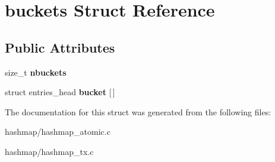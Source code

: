 \hypertarget{structbuckets}{}\section{buckets Struct Reference}
\label{structbuckets}
\subsection*{Public Attributes}
\begin{DoxyCompactItemize}
\item 
\mbox{\label{structbuckets_ab4b1efc42ff06fef401feb5297469441}} 
size\+\_\+t {\bfseries nbuckets}
\item 
\mbox{\label{structbuckets_a563609796b380211a16c9f0eb07c4ff6}} 
struct entries\+\_\+head {\bfseries bucket} \mbox{[}$\,$\mbox{]}
\end{DoxyCompactItemize}


The documentation for this struct was generated from the following files\+:\begin{DoxyCompactItemize}
\item 
hashmap/hashmap\+\_\+atomic.\+c\item 
hashmap/hashmap\+\_\+tx.\+c\end{DoxyCompactItemize}
